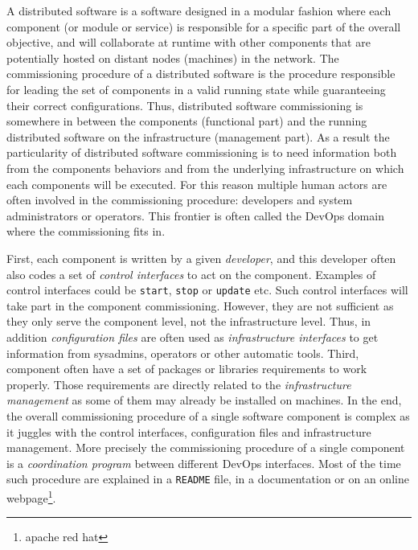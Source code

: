 
A distributed software is a software designed in a modular fashion
where each component (or module or service) is responsible for a
specific part of the overall objective, and will collaborate at
runtime with other components that are potentially hosted on distant
nodes (\ie machines) in the network.
%
The commissioning procedure of a distributed software is the procedure
responsible for leading the set of components in a valid running state
while guaranteeing their correct configurations. Thus, distributed
software commissioning is somewhere in between the components
(functional part) and the running distributed software on the
infrastructure (management part). As a result the particularity of
distributed software commissioning is to need information both from
the components behaviors and from the underlying infrastructure on
which each components will be executed.
For this reason multiple human actors are often involved in the
commissioning procedure: developers and system administrators or
operators. This frontier is often called the DevOps domain where the
commissioning fits in.

First, each component is written by a given \emph{developer}, and this
developer often also codes a set of \emph{control interfaces} to act
on the component. Examples of control interfaces could be
\texttt{start}, \texttt{stop} or \texttt{update} etc. Such control
interfaces will take part in the component commissioning. However,
they are not sufficient as they only serve the component level, not
the infrastructure level. Thus, in addition \emph{configuration files}
are often used as \emph{infrastructure interfaces} to get information
from sysadmins, operators or other automatic tools. Third, component
often have a set of packages or libraries requirements to work
properly. Those requirements are directly related to the
\emph{infrastructure management} as some of them may already be
installed on machines. In the end, the overall commissioning procedure
of a single software component is complex as it juggles with the
control interfaces, configuration files and infrastructure
management. More precisely the commissioning procedure of a single
component is a \emph{coordination program} between different DevOps
interfaces. Most of the time such procedure are explained in a
\texttt{README} file, in a documentation or on an online
webpage\footnote{apache red hat}.


